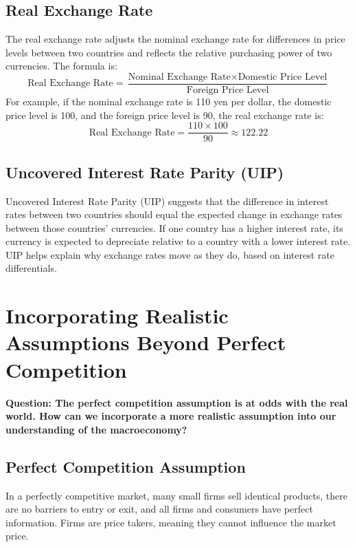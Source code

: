 \documentclass{article}
\begin{document}
\subsection{Real Exchange Rate}
The real exchange rate adjusts the nominal exchange rate for differences in price levels between two countries and reflects the relative purchasing power of two currencies. The formula is:
\begin{equation}
\text{Real Exchange Rate} = \frac{\text{Nominal Exchange Rate} \times \text{Domestic Price Level}}{\text{Foreign Price Level}}
\end{equation}
For example, if the nominal exchange rate is 110 yen per dollar, the domestic price level is 100, and the foreign price level is 90, the real exchange rate is:
\[ \text{Real Exchange Rate} = \frac{110 \times 100}{90} \approx 122.22 \]

\subsection{Uncovered Interest Rate Parity (UIP)}
Uncovered Interest Rate Parity (UIP) suggests that the difference in interest rates between two countries should equal the expected change in exchange rates between those countries' currencies. If one country has a higher interest rate, its currency is expected to depreciate relative to a country with a lower interest rate. UIP helps explain why exchange rates move as they do, based on interest rate differentials.

\section{Incorporating Realistic Assumptions Beyond Perfect Competition}
\textbf{Question: The perfect competition assumption is at odds with the real world. How can we incorporate a more realistic assumption into our understanding of the macroeconomy?}

\subsection{Perfect Competition Assumption}
In a perfectly competitive market, many small firms sell identical products, there are no barriers to entry or exit, and all firms and consumers have perfect information. Firms are price takers, meaning they cannot influence the market price.
\end{document}
